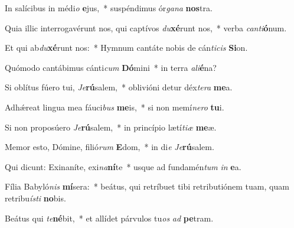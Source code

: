 \item In salícibus in médi\textit{o} \textbf{e}jus,~* suspéndimus ór\textit{ga}\textit{na} \textbf{nos}tra.
\item Quia illic interrogavérunt nos, qui captívos \textit{du}\textbf{xé}runt nos,~* verba \textit{can}\textit{ti}\textbf{ó}num.
\item Et qui ab\textit{du}\textbf{xé}runt nos:~* Hymnum cantáte nobis de cán\textit{ti}\textit{cis} \textbf{Si}on.
\item Quómodo cantábimus cánti\textit{cum} \textbf{Dó}mini~* in terra \textit{a}\textit{li}\textbf{é}na?
\item Si oblítus fúero tui, \textit{Je}\textbf{rú}salem,~* oblivióni detur déx\textit{te}\textit{ra} \textbf{me}a.
\item Adhǽreat lingua mea fáuci\textit{bus} \textbf{me}is,~* si non memí\textit{ne}\textit{ro} \textbf{tu}i.
\item Si non proposúero \textit{Je}\textbf{rú}salem,~* in princípio lætí\textit{ti}\textit{æ} \textbf{me}æ.
\item Memor esto, Dómine, filió\textit{rum} \textbf{E}dom,~* in di\textit{e} \textit{Je}\textbf{rú}salem.
\item Qui dicunt: Exinaníte, exi\textit{na}\textbf{ní}te~* usque ad fundamén\textit{tum} \textit{in} \textbf{e}a.
\item Fília Babyló\textit{nis} \textbf{mí}sera:~* beátus, qui retríbuet tibi retributiónem tuam, quam retribu\textit{ís}\textit{ti} \textbf{no}bis.
\item Beátus qui \textit{te}\textbf{né}bit,~* et allídet párvulos tu\textit{os} \textit{ad} \textbf{pe}tram.

